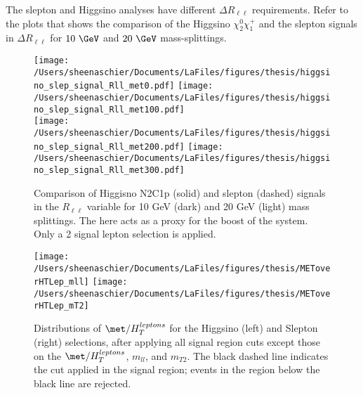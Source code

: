 The slepton and Higgsino analyses have different $\Delta R_{\ell\ell}$ requirements.  Refer to the plots that shows the comparison of the Higgsino $\chi_2^0\chi_1^+$ and the slepton signals in $\Delta R_{\ell\ell}$ for $10~\GeV$ and $20~\GeV$ mass-splittings.
  \begin{figure}[tbp]
     \texttt{[image: /Users/sheenaschier/Documents/LaFiles/figures/thesis/higgsino\_slep\_signal\_Rll\_met0.pdf]}
       \texttt{[image: /Users/sheenaschier/Documents/LaFiles/figures/thesis/higgsino\_slep\_signal\_Rll\_met100.pdf]}\\
     \texttt{[image: /Users/sheenaschier/Documents/LaFiles/figures/thesis/higgsino\_slep\_signal\_Rll\_met200.pdf]}
     \texttt{[image: /Users/sheenaschier/Documents/LaFiles/figures/thesis/higgsino\_slep\_signal\_Rll\_met300.pdf]}\\
   \caption{Comparison of Higgisno N2C1p (solid) and slepton (dashed) signals in the $R_{\ell\ell}$ variable for 10 GeV (dark) and 20 GeV (light) mass splittings. The \met{} here acts as a proxy for the boost of the system. Only a 2 signal lepton selection is applied.}
   \label{fig:Rll_signals only}
 \end{figure}
 
 \begin{figure}[tbp]
  \centering
  \texttt{[image: /Users/sheenaschier/Documents/LaFiles/figures/thesis/METoverHTLep\_mll]}
  \texttt{[image: /Users/sheenaschier/Documents/LaFiles/figures/thesis/METoverHTLep\_mT2]}
 \caption{Distributions of $\met/H_{T}^{leptons}$ for the Higgsino (left) and Slepton (right) selections, after applying all signal region cuts except those on the $\met/H_{T}^{leptons}$, $m_{ll}$, and $m_{T2}$.  The black dashed line indicates the cut applied in the signal region; events in the region below the black line are rejected.}
 \label{fig:METoverHTLep2D}
 \end{figure}
 

